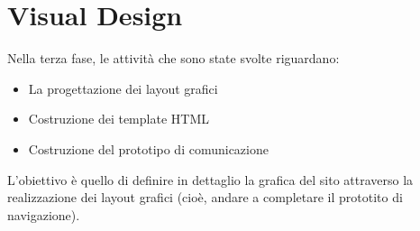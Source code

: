 
\chapter{Visual Design}\label{chap:visual-design}
Nella terza fase, le attività che sono state svolte riguardano:
\begin{itemize}
	\item La progettazione dei layout grafici
	\item Costruzione dei template HTML
	\item Costruzione del prototipo di comunicazione
\end{itemize}
L'obiettivo è quello di definire in dettaglio la grafica del sito attraverso la 
realizzazione dei layout grafici (cioè, andare a completare il prototito di navigazione).

